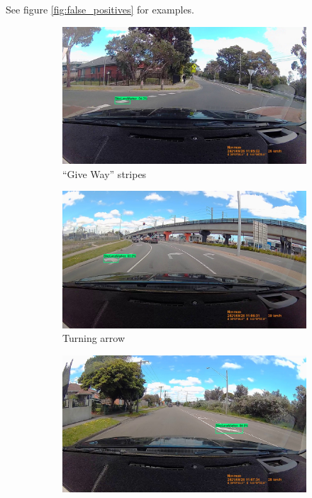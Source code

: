 \documentclass[11pt,twoside]{report}
\begin{document}
See figure \ref{fig:false_positives} for examples.

\begin{figure}[h]
\centering
\begin{subfigure}{0.3\textwidth}
	\includegraphics[width=\textwidth]{f005_false_positive_give_way.jpg}
	\caption{``Give Way'' stripes}
\end{subfigure}
\hfill
\begin{subfigure}{0.3\textwidth}
	\includegraphics[width=\textwidth]{f005_false_positive_arrow.jpg}
	\caption{Turning arrow}
\end{subfigure}
\hfill
\begin{subfigure}{0.3\textwidth}
	\includegraphics[width=\textwidth]{f005_false_positive_island.jpg}

\end{subfigure}
\end{figure}
\end{document}
